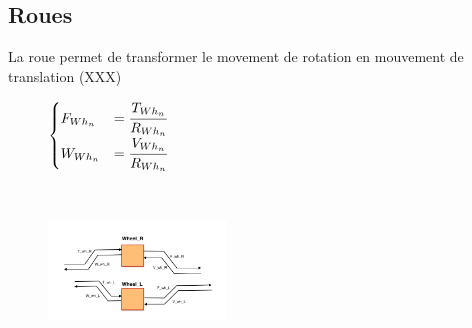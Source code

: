 \subsection{Roues}
La roue permet de transformer le movement de rotation en mouvement de translation (XXX)
\vspace{-10px}
\begin{figure}[ht]
\centering
\begin{minipage}{.5\textwidth}  
\centering
$\begin{cases}
	F_{Wh_n} &= \cfrac{T_{Wh_n}}{R_{Wh_n}}  \\
	W_{Wh_n} &= \cfrac{V_{Wh_n}}{R_{Wh_n}}
\end{cases}$
\end{minipage}~
\begin{minipage}{.5\textwidth}
  \centering
\includegraphics[height=100px]{images/Wheel.png}
\end{minipage}
\end{figure}
\FloatBarrier
\vspace{-30px}

\newpage
